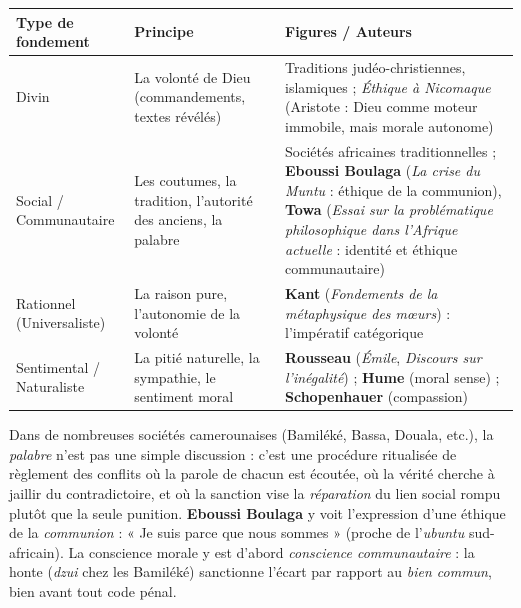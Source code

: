 \documentclass[11pt]{article}
\begin{document}
\begin{aretenir}
\begin{center}
\begin{tabularx}{\linewidth}{|l|X|X|}
\hline
\rowcolor{popblueL} \textbf{Type de fondement} & \textbf{Principe} & \textbf{Figures / Auteurs} \\
\hline
Divin & La volonté de Dieu (commandements, textes révélés) & Traditions judéo-christiennes, islamiques ; \emph{Éthique à Nicomaque} (Aristote : Dieu comme moteur immobile, mais morale autonome) \\
\hline
Social / Communautaire & Les coutumes, la tradition, l'autorité des anciens, la palabre & Sociétés africaines traditionnelles ; \textbf{Eboussi Boulaga} (\emph{La crise du Muntu} : éthique de la communion), \textbf{Towa} (\emph{Essai sur la problématique philosophique dans l'Afrique actuelle} : identité et éthique communautaire) \\
\hline
Rationnel (Universaliste) & La raison pure, l'autonomie de la volonté & \textbf{Kant} (\emph{Fondements de la métaphysique des mœurs}) : l'impératif catégorique \\
\hline
Sentimental / Naturaliste & La pitié naturelle, la sympathie, le sentiment moral & \textbf{Rousseau} (\emph{Émile}, \emph{Discours sur l'inégalité}) ; \textbf{Hume} (moral sense) ; \textbf{Schopenhauer} (compassion) \\
\hline
\end{tabularx}
\end{center}
\end{aretenir}

\begin{savaistu}
Dans de nombreuses sociétés camerounaises (Bamiléké, Bassa, Douala, etc.), la \emph{palabre} n'est pas une simple discussion : c'est une procédure ritualisée de règlement des conflits où la parole de chacun est écoutée, où la vérité cherche à jaillir du contradictoire, et où la sanction vise la \emph{réparation} du lien social rompu plutôt que la seule punition. \textbf{Eboussi Boulaga} y voit l'expression d'une éthique de la \emph{communion} : « Je suis parce que nous sommes » (proche de l'\emph{ubuntu} sud-africain). La conscience morale y est d'abord \emph{conscience communautaire} : la honte (\emph{dzui} chez les Bamiléké) sanctionne l'écart par rapport au \emph{bien commun}, bien avant tout code pénal.
\end{savaistu}
\end{document}
